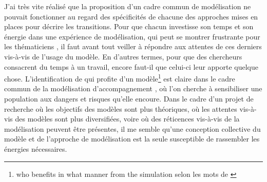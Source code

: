J'ai très vite réalisé que la proposition d'un cadre commun de modélisation ne pouvait fonctionner au regard des spécificités de chacune des approches mises en places pour décrire les transitions.
Pour que chacun investisse son temps et son énergie dans une expérience de modélisation, qui peut se montrer frustrante pour les thématiciens \autocite[470]{ouriachi_lelaboration_2017}, il faut avant tout veiller à répondre aux attentes de ces derniers vis-à-vis de l'usage du modèle.
En d'autres termes, pour que des chercheurs consacrent du temps à un travail, encore faut-il que celui-ci leur apporte quelque chose.
L'identification de qui \og profite\fg{} d'un modèle\footnote{
\og who benefits in what manner from the simulation\fg{} selon les mots de \textcite[260]{lake_trends_2014}
} est claire dans le cadre commun de la \og modélisation d'accompagnement\fg{} \autocite[voir][par exemple]{etienne_modelisation_2015}, où l'on cherche à sensibiliser une population aux dangers et risques qu'elle encoure.
Dans le cadre d'un projet de recherche où les objectifs des modèles sont plus théoriques, où les attentes vis-à-vis des modèles sont plus diversifiées, voire où des réticences vis-à-vis de la modélisation peuvent être présentes, il me semble qu'une conception collective du modèle et de l'approche de modélisation est la seule susceptible de rassembler les énergies nécessaires.

